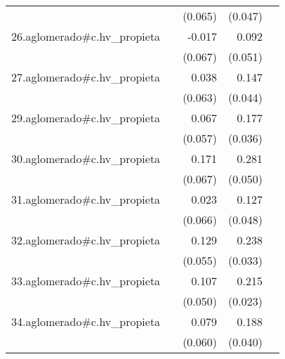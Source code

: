 {\begin{longtable}{l*{4}{D{.}{.}{-1}}}
            &                     &     (0.065)         &     (0.047)         &                     \\
\addlinespace
26.aglomerado#c.hv\_propieta&                     &      -0.017         &       0.092         &                     \\
            &                     &     (0.067)         &     (0.051)         &                     \\
\addlinespace
27.aglomerado#c.hv\_propieta&                     &       0.038         &       0.147\sym{***}&                     \\
            &                     &     (0.063)         &     (0.044)         &                     \\
\addlinespace
29.aglomerado#c.hv\_propieta&                     &       0.067         &       0.177\sym{***}&                     \\
            &                     &     (0.057)         &     (0.036)         &                     \\
\addlinespace
30.aglomerado#c.hv\_propieta&                     &       0.171\sym{**} &       0.281\sym{***}&                     \\
            &                     &     (0.067)         &     (0.050)         &                     \\
\addlinespace
31.aglomerado#c.hv\_propieta&                     &       0.023         &       0.127\sym{**} &                     \\
            &                     &     (0.066)         &     (0.048)         &                     \\
\addlinespace
32.aglomerado#c.hv\_propieta&                     &       0.129\sym{*}  &       0.238\sym{***}&                     \\
            &                     &     (0.055)         &     (0.033)         &                     \\
\addlinespace
33.aglomerado#c.hv\_propieta&                     &       0.107\sym{*}  &       0.215\sym{***}&                     \\
            &                     &     (0.050)         &     (0.023)         &                     \\
\addlinespace
34.aglomerado#c.hv\_propieta&                     &       0.079         &       0.188\sym{***}&                     \\
            &                     &     (0.060)         &     (0.040)         &                     \\

\end{longtable}}
